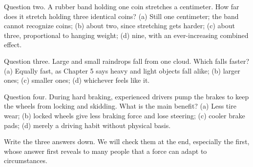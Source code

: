 Question two. A rubber band holding one coin stretches a centimeter. How far does it stretch holding three identical coins? (a) Still one centimeter; the band cannot recognize coins; (b) about two, since stretching gets harder; (c) about three, proportional to hanging weight; (d) nine, with an ever-increasing combined effect.

Question three. Large and small raindrops fall from one cloud. Which falls faster? (a) Equally fast, as Chapter 5 says heavy and light objects fall alike; (b) larger ones; (c) smaller ones; (d) whichever feels like it.

Question four. During hard braking, experienced drivers pump the brakes to keep the wheels from locking and skidding. What is the main benefit? (a) Less tire wear; (b) locked wheels give less braking force and lose steering; (c) cooler brake pads; (d) merely a driving habit without physical basis.

Write the three answers down. We will check them at the end, especially the first, whose answer first reveals to many people that a force can adapt to circumstances.


